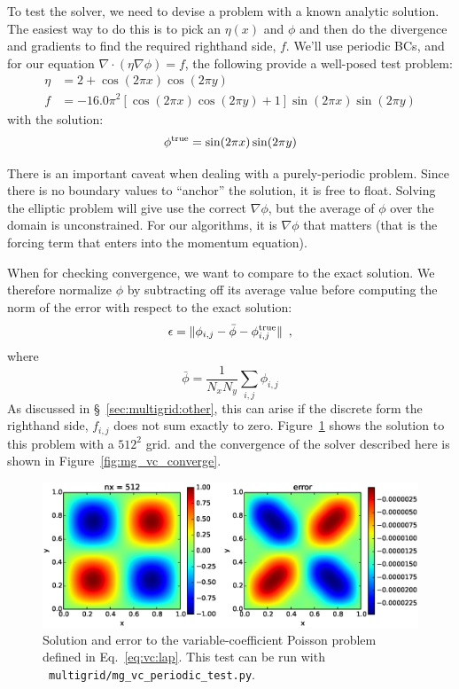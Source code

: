 To test the solver, we need to devise a problem with a known analytic
solution.  The easiest way to do this is to pick an $\eta(x)$ and
$\phi$ and then do the divergence and gradients to find the required
righthand side, $f$.  We'll use periodic BCs, and for our
equation $\nabla \cdot ( \eta \nabla \phi ) = f$, the following
provide a well-posed test problem:
\begin{align}
\eta &= 2 + \cos(2\pi x) \cos(2\pi y)  \label{eq:vc:lap}
\\
f &= -16.0 \pi^2 \left [ \cos(2\pi x)\cos(2\pi y) + 1 \right ] \sin(2\pi x)\sin(2 \pi y) \nonumber
\end{align}
with the solution:
\begin{equation}
\phi^\mathrm{true} = \sin(2 \pi x) \sin(2\pi y) \nonumber \\
\end{equation}

There is an important caveat when dealing with a purely-periodic
problem.  Since there is no boundary values to ``anchor'' the solution,
it is free to float.  Solving the elliptic problem will give use the
correct $\nabla \phi$, but the average of $\phi$ over the domain is 
unconstrained.  For our algorithms, it is $\nabla \phi$ that matters
(that is the forcing term that enters into the momentum equation).

When for checking convergence, we want to compare to the exact solution.
We therefore normalize $\phi$ by subtracting off its average value before
computing the norm of the error with respect to the exact solution:
\begin{equation}
\epsilon = \| \phi_{i,j} - \bar{\phi} - \phi^\mathrm{true}_{i,j} \| \enskip ,
\end{equation}
where
\begin{equation}
\bar{\phi} = \frac{1}{N_x N_y} \sum_{i,j} \phi_{i,j}
\end{equation}
As discussed in \S~\ref{sec:multigrid:other}, this can arise if
the discrete form the righthand side, $f_{i,j}$ does not sum exactly
to zero.  Figure~\ref{fig:mg_vc} shows the solution to this problem
with a $512^2$ grid. and the convergence of the solver described
here is shown in Figure~\ref{fig:mg_vc_converge}.

\begin{figure}[t]
\centering
\includegraphics[width=\linewidth]{mg_vc_periodic_test}
\caption[Solution and error of a variable-coefficient Poisson problem]{\label{fig:mg_vc} Solution and error to the variable-coefficient 
Poisson problem defined in Eq.~\ref{eq:vc:lap}.  This test can be
run with \pyro\ {\tt multigrid/mg\_vc\_periodic\_test.py}.}
\end{figure}

